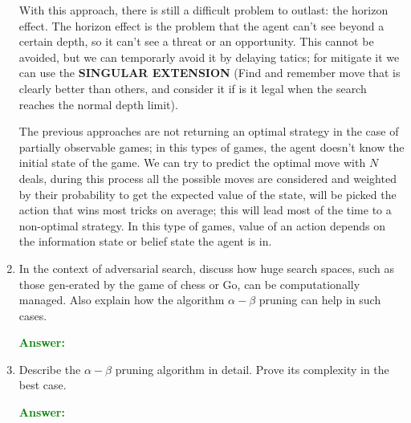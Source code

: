 \documentclass[12pt]{article}
\begin{document}
\begin{enumerate}[label=\textbf{AS.\arabic*}]
    With this approach, there is still a difficult problem to outlast: the horizon effect.
    The horizon effect is the problem that the agent can't see beyond a certain depth, so it can't see a threat or an opportunity.
    This cannot be avoided, but we can temporarly avoid it by delaying tatics; for mitigate it we can use the \textbf{SINGULAR EXTENSION} 
    (Find and remember move that is clearly better than others, and consider it if is it legal when the search reaches the normal depth limit).

    The previous approaches are not returning an optimal strategy in the case of partially observable games; in this types of games, 
    the agent doesn't know the initial state of the game.
    We can try to predict the optimal move with $N$ deals, during this process all the possible moves are considered and weighted by their probability 
    to get the expected value of the state, will be picked the action that wins most tricks on average;
    this will lead most of the time to a non-optimal strategy.
    In this type of games, value of an action depends on the information state or belief state the agent is in.

    \item In the context of adversarial search, discuss how huge search spaces, such as those gen-erated by the game of chess or Go, can be computationally managed.
    Also explain how the algorithm $\alpha - \beta$ pruning can help in such cases.

    \textcolor{green}{\textbf{Answer:}}

    \item Describe the $\alpha - \beta$ pruning algorithm in detail. Prove its complexity in the best case.
    
    \textcolor{green}{\textbf{Answer:}}
\end{enumerate}
\end{document}
